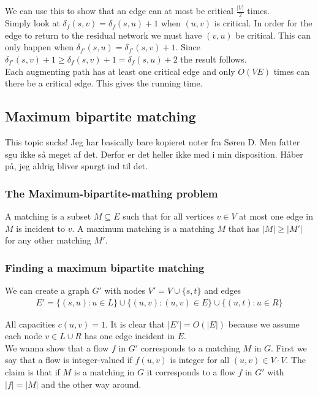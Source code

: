 We can use this to show that an edge can at most be critical $\frac{|V|}{2}$ times. \\

Simply look at $\delta_f(s, v) = \delta_f(s, u) +1$ when $(u, v)$ is critical. In order for the edge to return to the residual network we must have $(v, u)$ be critical. This can only happen when $\delta_{f'}(s, u) = \delta_{f'}(s, v) + 1$. Since $\delta_{f'}(s, v) + 1 \geq \delta_f(s, v) + 1 = \delta_f(s, u) +2$ the result follows. \\

Each augmenting path has at least one critical edge and only $O(VE)$ times can there be a critical edge. This gives the running time. 
%
\subsection{Maximum bipartite matching}
This topic sucks! Jeg har basically bare kopieret noter fra Søren D. Men fatter sgu ikke så meget af det. Derfor er det heller ikke med i min disposition. Håber på, jeg aldrig bliver spurgt ind til det. 

\subsubsection{The Maximum-bipartite-mathing problem}
A matching is a subset $M \subseteq E$ such that for all vertices $v \in V$ at most one edge in $M$ is incident to $v$. A maximum matching is a matching $M$ that has $|M| \geq |M'|$ for any other matching $M'$.
%
\subsubsection{Finding a maximum bipartite matching}
We can create a graph $G'$ with nodes $V' = V \cup \{s, t\}$ and edges
\begin{align*}
E' = \{(s, u) : u \in L\} \cup \{(u, v) : (u, v) \in E \} \cup \{(u, t) : u \in R\}
\end{align*}

All capacities $c(u, v) = 1$. It is clear that $|E'| = O(|E|)$ because we assume each node $v \in L \cup R$ has one edge incident in $E$. \\

We wanna show that a flow $f$ in $G'$ corresponds to a matching $M$ in $G$. First we say that a flow is integer-valued if $f(u,v)$ is integer for all $(u,v) \in V 	\cdot V$. The claim is that if $M$ is a matching in $G$ it corresponds to a flow $f$ in $G'$ with $|f| = |M|$ and the other way around.\\

